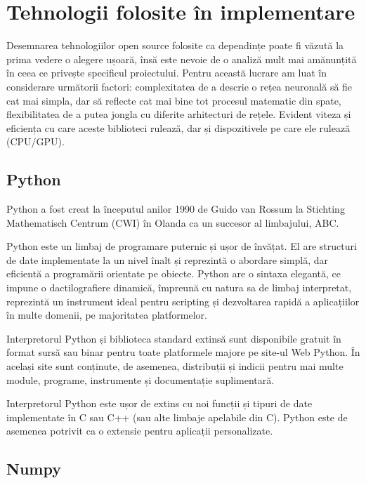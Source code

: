 \chapter{Tehnologii folosite în implementare}

Desemnarea tehnologiilor open source folosite ca dependințe poate fi văzută la prima vedere o alegere ușoară, însă este nevoie de o analiză mult mai amănunțită în ceea ce privește specificul proiectului.
Pentru această lucrare am luat în considerare următorii factori: complexitatea de a descrie o rețea neuronală să fie cat mai simpla, dar să reflecte cat mai bine tot procesul matematic din spate, flexibilitatea de a putea jongla cu diferite arhitecturi de rețele. Evident viteza și eficiența cu care aceste biblioteci rulează, dar și dispozitivele pe care ele rulează (CPU/GPU).

\section{Python}

Python a fost creat la începutul anilor 1990 de Guido van Rossum la Stichting Mathematisch Centrum (CWI) în Olanda ca un succesor al limbajului, ABC. \cite{pythonhistory}

Python este un limbaj de programare puternic și ușor de învățat. El are structuri de date implementate la un nivel înalt și reprezintă o abordare simplă, dar eficientă a programării orientate pe obiecte. Python are o sintaxa elegantă, ce impune o dactilografiere dinamică, împreună cu natura sa de limbaj interpretat, reprezintă un instrument ideal pentru scripting și dezvoltarea rapidă a aplicațiilor în multe domenii, pe majoritatea platformelor.

Interpretorul Python și biblioteca standard extinsă sunt disponibile gratuit în format sursă sau binar pentru toate platformele majore pe site-ul Web Python. În același site sunt conținute, de asemenea, distribuții și indicii pentru mai multe module, programe, instrumente și documentație suplimentară.

Interpretorul Python este ușor de extins cu noi funcții și tipuri de date implementate în C sau C++ (sau alte limbaje apelabile din C). Python este de asemenea potrivit ca o extensie pentru aplicații personalizate.
\cite{python_tutorial}

\section{Numpy}

